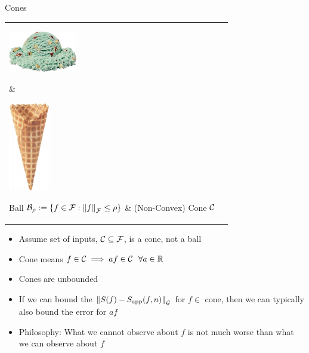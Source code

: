 \documentclass[11pt,compress,xcolor={usenames,dvipsnames},aspectratio=169]{beamer}
\newcommand{\Sapp}{S_{\textup{app}}}
\newcommand{\scoop}[1]{\parbox{#1}{\includegraphics[width=#1]{IceCreamScoop.eps}}\xspace}
\newcommand{\largescoop}{\scoop{3cm}}
\newcommand{\ICcone}[1]{\parbox{#1}{\includegraphics[width=#1,angle=270]{MediumWaffleCone.eps}}\xspace}
\newcommand{\largecone}{\ICcone{1.8cm}}
\begin{document}
\begin{frame}[label = ConeFrame]{Cones}
\vspace{-4ex}
\begin{tabular}{>{\centering}m{}@{\qquad}>{\centering}m{}}
     \largescoop \hspace{-3cm}\raisebox{-4ex}{\color{red}\fontsize{100}{120}\selectfont $\times$} & 
      \largecone \tabularnewline
      Ball $\cb_{\rho} := \{f \in \cf : \norm[\cf]{f} \le \rho \}$ &
      \hspace{2cm} (Non-Convex) Cone $\cc$
\end{tabular}

\begin{itemize}
    \item Assume set of inputs, $\cc \subseteq \cf$, is a \alert{cone}, not a ball
    
    \item \alert{Cone} means $f \in \cc \implies af \in \cc \ \ \forall a \in \reals$
    
    \item \alert{Cones} are unbounded
    
    \item If we can bound the $\norm[\cg]{S(f) - \Sapp(f,n)}$ for $f \in $ \alert{cone}, then we can typically also bound the error  for $af$
    
    
    \item \alert{Philosophy:}  What we cannot observe about $f$ is not much worse than what we can observe about $f$
    
\end{itemize}

    
\end{frame}
\end{document}
